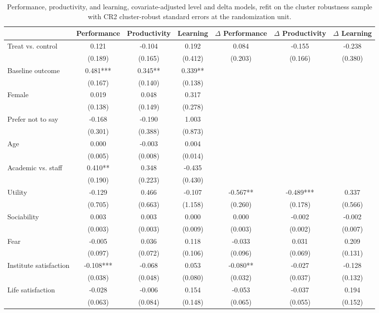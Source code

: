 \begin{table}
\centering
\caption{Performance, productivity, and learning, covariate-adjusted level and delta models, refit on the cluster robustness sample with CR2 cluster-robust standard errors at the randomization unit.\label{tab:lm-performance-cov-cluster}}
\centering
\begin{tabular}[t]{lcccccc}
\toprule
  & Performance & Productivity & Learning & $\Delta$ Performance & $\Delta$ Productivity & $\Delta$ Learning\\
\midrule
Treat vs. control & 0.121 & -0.104 & 0.192 & 0.084 & -0.155 & -0.238\\
 & (0.189) & (0.165) & (0.412) & (0.203) & (0.166) & (0.380)\\
Baseline outcome & 0.481*** & 0.345** & 0.339** &  &  & \\
 & (0.167) & (0.140) & (0.138) &  &  & \\
Female & 0.019 & 0.048 & 0.317 &  &  & \\
 & (0.138) & (0.149) & (0.278) &  &  & \\
Prefer not to say & -0.168 & -0.190 & 1.003 &  &  & \\
 & (0.301) & (0.388) & (0.873) &  &  & \\
Age & 0.000 & -0.003 & 0.004 &  &  & \\
 & (0.005) & (0.008) & (0.014) &  &  & \\
Academic vs. staff & 0.410** & 0.348 & -0.435 &  &  & \\
 & (0.190) & (0.223) & (0.430) &  &  & \\
Utility & -0.129 & 0.466 & -0.107 & -0.567** & -0.489*** & 0.337\\
 & (0.705) & (0.663) & (1.158) & (0.260) & (0.178) & (0.566)\\
Sociability & 0.003 & 0.003 & 0.000 & 0.000 & -0.002 & -0.002\\
 & (0.003) & (0.003) & (0.009) & (0.003) & (0.002) & (0.007)\\
Fear & -0.005 & 0.036 & 0.118 & -0.033 & 0.031 & 0.209\\
 & (0.097) & (0.072) & (0.106) & (0.096) & (0.069) & (0.131)\\
Institute satisfaction & -0.108*** & -0.068 & 0.053 & -0.080** & -0.027 & -0.128\\
 & (0.038) & (0.048) & (0.080) & (0.032) & (0.037) & (0.132)\\
Life satisfaction & -0.028 & -0.006 & 0.154 & -0.053 & -0.037 & 0.194\\
 & (0.063) & (0.084) & (0.148) & (0.065) & (0.055) & (0.152)\\

\end{tabular}
\end{table}
